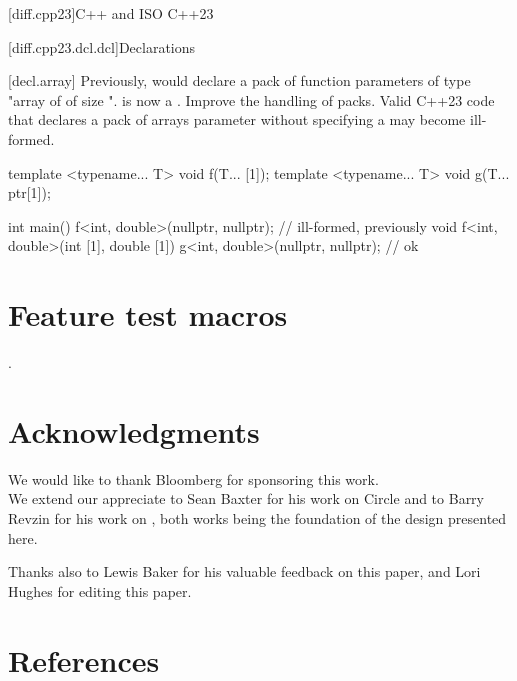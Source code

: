 \documentclass{wg21}
\begin{document}
\begin{addedblock}

[diff.cpp23]{C++ and ISO C++23}

[diff.cpp23.dcl.dcl]{Declarations}

[decl.array]
\change
Previously,  would declare a pack of function parameters of type "array of  of size ".
 is now a .
\rationale
Improve the handling of packs.
\effect
Valid C++23 code that declares a
pack of arrays parameter without specifying a  may become ill-formed.

\begin{codeblock}
template <typename... T>
void f(T... [1]);
template <typename... T>
void g(T... ptr[1]);

int main() {
    f<int, double>(nullptr, nullptr); // ill-formed, previously void f<int, double>(int [1], double [1])
    g<int, double>(nullptr, nullptr); // ok
}
\end{codeblock}

\begin{colorblock}

\end{colorblock}

\end{addedblock}

\section{Feature test macros}

.


\section{Acknowledgments}

We would like to thank Bloomberg for sponsoring this work.\\

We extend our appreciate to Sean Baxter for his work on Circle and to Barry Revzin  for his work on , both works being the foundation of the design presented here.

Thanks also to Lewis Baker for his valuable feedback on this paper, and Lori Hughes for editing this paper.

\section{References} %
\end{document}
